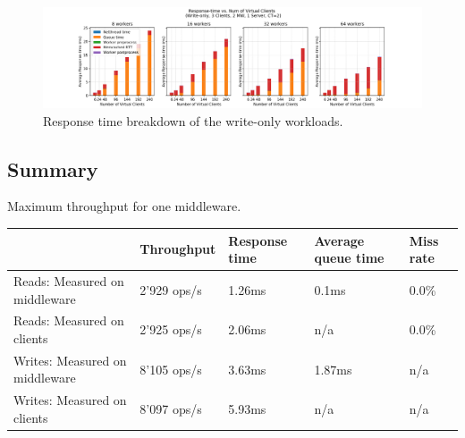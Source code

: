 \begin{figure}[H]
    \centering
	\includegraphics[scale=0.48,width=\linewidth]{figures/2_BaselineWithMW/two_mws/two_mws_rt_breakdown_write_2018-12-07_09h02.png}
	\caption{Response time breakdown of the write-only workloads.}
	\label{rt_breakdown_write_two_mws}
\end{figure}
\subsection{Summary}
\begin{center}
	{Maximum throughput for one middleware.}
	\begin{tabular}{|p{5.7cm}|p{2.1cm}|p{1.9cm}|p{1.9cm}|p{1.9cm}|}
		\hline                                & Throughput & Response time  & Average queue time & Miss rate  \\ 
		\hline Reads: Measured on middleware  &2'929 ops/s &1.26ms&      0.1ms &  0.0\%        \\ 
		\hline Reads: Measured on clients     & 2'925 ops/s&   2.06ms    & n/a   &   0.0\%    \\ 
		\hline Writes: Measured on middleware &   8'105 ops/s & 3.63ms         &    1.87ms      & n/a   \\ 
		\hline Writes: Measured on clients    &  8'097 ops/s&  5.93ms           & n/a                   & n/a      \\ 
		\hline 
	\end{tabular}
\end{center}

